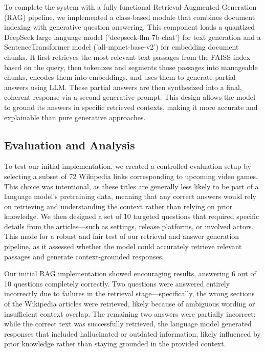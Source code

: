 \documentclass[fleqn,moreauthors,10pt]{ds_report}
\begin{document}
To complete the system with a fully functional Retrieval-Augmented Generation (RAG) pipeline, we implemented a class-based module that combines document indexing with generative question answering. This component loads a quantized DeepSeek \cite{deepseek} large language model ('deepseek-llm-7b-chat') for text generation and a SentenceTransformer model ('all-mpnet-base-v2') for embedding document chunks. It first retrieves the most relevant text passages from the FAISS index based on the query, then tokenizes and segments those passages into manageable chunks, encodes them into embeddings, and uses them to generate partial answers using LLM. These partial answers are then synthesized into a final, coherent response via a second generative prompt. This design allows the model to ground its answers in specific retrieved contexts, making it more accurate and explainable than pure generative approaches.

\subsection*{Evaluation and Analysis}
To test our initial implementation, we created a controlled evaluation setup by selecting a subset of 72 Wikipedia links corresponding to upcoming video games. This choice was intentional, as these titles are generally less likely to be part of a language model’s pretraining data, meaning that any correct answers would rely on retrieving and understanding the context rather than relying on prior knowledge. We then designed a set of 10 targeted questions that required specific details from the articles—such as settings, release platforms, or involved actors. This made for a robust and fair test of our retrieval and answer generation pipeline, as it assessed whether the model could accurately retrieve relevant passages and generate context-grounded responses. 

Our initial RAG implementation showed encouraging results, answering 6 out of 10 questions completely correctly. Two questions were answered entirely incorrectly due to failures in the retrieval stage—specifically, the wrong sections of the Wikipedia articles were retrieved, likely because of ambiguous wording or insufficient context overlap. The remaining two answers were partially incorrect: while the correct text was successfully retrieved, the language model generated responses that included hallucinated or outdated information, likely influenced by prior knowledge rather than staying grounded in the provided context.
\end{document}
